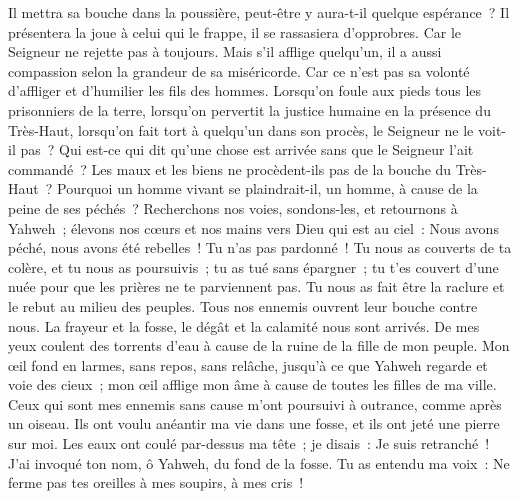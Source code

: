 \begin{multicols}{2}
Il mettra sa bouche dans la poussière, peut-être y aura-t-il quelque espérance~?
Il présentera la joue à celui qui le frappe, il se rassasiera d'opprobres.
 Car le Seigneur ne rejette pas à toujours.
Mais s'il afflige quelqu'un, il a aussi compassion selon la grandeur de sa miséricorde.
Car ce n'est pas sa volonté d'affliger et d'humilier les fils des hommes.
 Lorsqu'on foule aux pieds tous les prisonniers de la terre,
lorsqu'on pervertit la justice humaine en la présence du Très-Haut,
lorsqu'on fait tort à quelqu'un dans son procès, le Seigneur ne le voit-il pas~?
 Qui est-ce qui dit qu'une chose est arrivée sans que le Seigneur l'ait commandé~?
Les maux et les biens ne procèdent-ils pas de la bouche du Très-Haut~?
Pourquoi un homme vivant se plaindrait-il, un homme, à cause de la peine de ses péchés~?
 Recherchons nos voies, sondons-les, et retournons à Yahweh~;
élevons nos cœurs et nos mains vers Dieu qui est au ciel~:
Nous avons péché, nous avons été rebelles~! Tu n'as pas pardonné~!
 Tu nous as couverts de ta colère, et tu nous as poursuivis~; tu as tué sans épargner~;
tu t'es couvert d'une nuée pour que les prières ne te parviennent pas.
Tu nous as fait être la raclure et le rebut au milieu des peuples.
 Tous nos ennemis ouvrent leur bouche contre nous.
La frayeur et la fosse, le dégât et la calamité nous sont arrivés.
De mes yeux coulent des torrents d'eau à cause de la ruine de la fille de mon peuple.
 Mon œil fond en larmes, sans repos, sans relâche,
jusqu'à ce que Yahweh regarde et voie des cieux~;
mon œil afflige mon âme à cause de toutes les filles de ma ville.
 Ceux qui sont mes ennemis sans cause m'ont poursuivi à outrance, comme après un oiseau.
Ils ont voulu anéantir ma vie dans une fosse, et ils ont jeté une pierre sur moi.
Les eaux ont coulé par-dessus ma tête~; je disais~: Je suis retranché~!
 J'ai invoqué ton nom, ô Yahweh, du fond de la fosse.
Tu as entendu ma voix~: Ne ferme pas tes oreilles à mes soupirs, à mes cris~!

\end{multicols}
